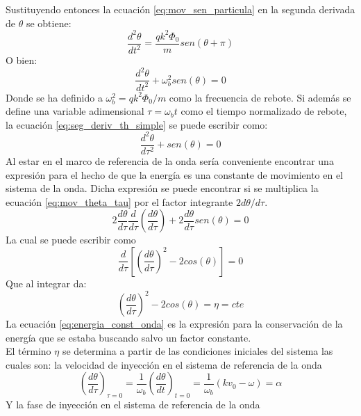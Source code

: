 \documentclass[../tesis_main_file.tex]{subfiles}
\begin{document}
Sustituyendo entonces la ecuación \ref{eq:mov_sen_particula} en la segunda derivada de $\theta$ se obtiene:
\begin{equation}
\label{eq:seg_deriv_theta_sustitucion}
\frac{d^2\theta}{dt^2}=\frac{qk^2\Phi_0}{m}sen(\theta + \pi)
\end{equation}
O bien:
\begin{equation}
\label{eq:seg_deriv_th_simple}
\frac{d^2\theta}{dt^2}+\omega_b^2 sen(\theta)=0
\end{equation}
Donde se ha definido a $\omega_b^2 = qk^2\Phi_0/m$ como la frecuencia de rebote. Si además se define una variable adimensional $\tau = \omega_b t$ como el tiempo normalizado de rebote, la ecuación \ref{eq:seg_deriv_th_simple} se puede escribir como:
\begin{equation}
\label{eq:mov_theta_tau}
\frac{d^2\theta}{d\tau^2}+sen(\theta)=0
\end{equation}
Al estar en el marco de referencia de la onda sería conveniente encontrar una expresión para el hecho de que la energía es una constante de movimiento en el sistema de la onda. Dicha expresión se puede encontrar si se multiplica la ecuación \ref{eq:mov_theta_tau} por el factor integrante $2d\theta/d\tau$.
\begin{equation}
2\frac{d\theta}{d\tau}\frac{d}{d\tau}\left(\frac{d\theta}{d\tau}\right) + 2\frac{d\theta}{d\tau}sen(\theta)=0
\end{equation}
La cual se puede escribir como
\begin{equation}
\label{eq:energia_constante_1}
\frac{d}{d\tau}\left[\left(\frac{d\theta}{d\tau}\right)^2 -2cos(\theta)\right]=0
\end{equation}
Que al integrar da:
\begin{equation}
\label{eq:energia_const_onda}
\left(\frac{d\theta}{d\tau}\right)^2 -2cos(\theta)=\eta=cte
\end{equation}
La ecuación \ref{eq:energia_const_onda} es la expresión para la conservación de la energía que se estaba buscando salvo un factor constante.\\
El término $\eta$ se determina a partir de las condiciones iniciales del sistema las cuales son: la velocidad de inyección en el sistema de referencia de la onda
\begin{equation}
\label{eq:wave_frame_injection_velocity}
\left(\frac{d\theta}{d\tau}\right)_{\tau =0}=\frac{1}{\omega_b}\left(\frac{d\theta}{dt}\right)_{t=0}=\frac{1}{\omega_b}(kv_0-\omega)=\alpha
\end{equation}
Y la fase de inyección en el sistema de referencia de la onda
\end{document}
